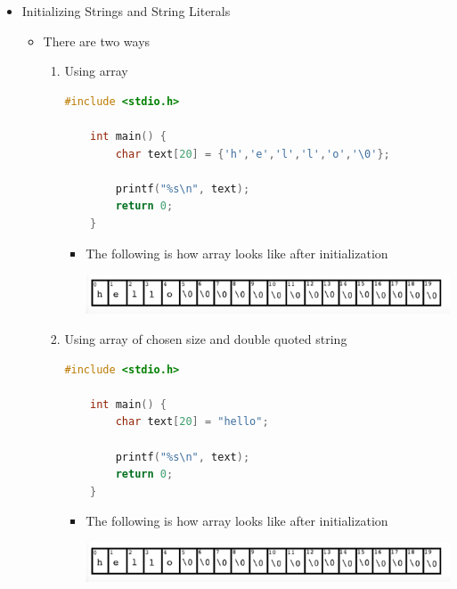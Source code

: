 \documentclass[12pt]{article}
\begin{document}
\begin{itemize}
    \item Initializing Strings and String Literals
    \begin{itemize}
        \item There are two ways
        \begin{enumerate}[1.]
            \item Using array
    \begin{lstlisting}[language=c]
    #include <stdio.h>

    int main() {
        char text[20] = {'h','e','l','l','o','\0'};

        printf("%s\n", text);
        return 0;
    }
    \end{lstlisting}

            \begin{itemize}
                \item The following is how array looks like after initialization

                \begin{center}
                \includegraphics[width=\linewidth]{images/work_5_notes_string_part_2_1.png}
                \end{center}

            \end{itemize}

            \item Using array of chosen size and double quoted string

    \begin{lstlisting}[language=c]
    #include <stdio.h>

    int main() {
        char text[20] = "hello";

        printf("%s\n", text);
        return 0;
    }
    \end{lstlisting}

            \begin{itemize}
                \item The following is how array looks like after initialization

                \begin{center}
                \includegraphics[width=\linewidth]{images/work_5_notes_string_part_2_1.png}
                \end{center}


\end{itemize}
\end{enumerate}
\end{itemize}
\end{itemize}
\end{document}
